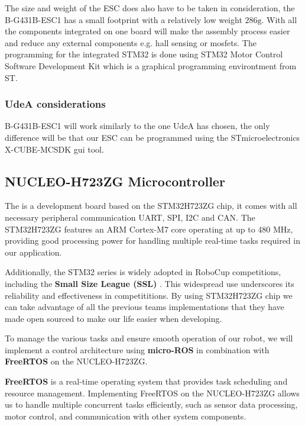 \documentclass[a4paper,8pt]{article}
\begin{document}
  The size and weight of the ESC does also have to be taken in
  consideration, the B-G431B-ESC1 has a small footprint with a
  relatively low weight $286\text{g}$. With all the components
  integrated on one board will make the assembly process easier and
  reduce any external components e.g. hall sensing or mosfets. The
  programming for the integrated STM32 is done using STM32 Motor Control
  Software Development Kit which is a graphical programming environtment
  from ST.

  \subsubsection{UdeA considerations}

  B-G431B-ESC1 will work similarly to the one UdeA has chosen, the only difference will be that our ESC can be programmed using the STmicroelectronics X-CUBE-MCSDK gui tool.

  \subsection{NUCLEO-H723ZG Microcontroller}

  The  is a development board based on the
  STM32H723ZG chip, it comes with all necessary peripheral communication
  UART, SPI, I2C and CAN. The STM32H723ZG features an ARM Cortex-M7 core
  operating at up to 480 MHz, providing good processing power for
  handling multiple real-time tasks required in our application.

  Additionally, the STM32 series is widely adopted in RoboCup
  competitions, including the \textbf{Small Size League (SSL)} \cite{ryllExtendedTeamDescription}\cite{zhaoZJUNlictExtendedTeam}\cite{wuCompilationErrorTeam}.
  This widespread use underscores its reliability and effectiveness in
  competititions. By using STM32H723ZG chip we can take advantage of all the previous teams implementations that they have made open sourced to make our life easier when developing.

  To manage the various tasks and ensure smooth operation of our robot,
  we will implement a control architecture using \textbf{micro-ROS} in
  combination with \textbf{FreeRTOS} on the NUCLEO-H723ZG.

  \textbf{FreeRTOS} is a real-time operating system that provides task
  scheduling and resource management. Implementing FreeRTOS on the
  NUCLEO-H723ZG allows us to handle multiple concurrent tasks
  efficiently, such as sensor data processing, motor control, and
  communication with other system components.
\end{document}
